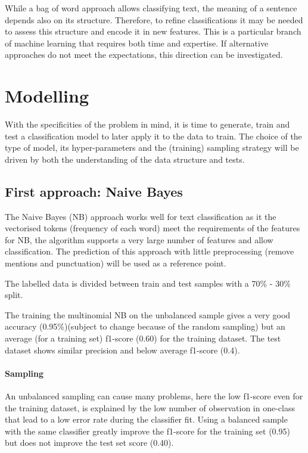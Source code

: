 \documentclass[a4paper]{tufte-handout}
\begin{document}
\begin{fullwidth}
While a bag of word approach allows classifying text, the meaning of a sentence depends also on its structure. Therefore, to refine classifications it may be needed to assess this structure and encode it in new features. This is a particular branch of machine learning that requires both time and expertise. If alternative approaches do not meet the expectations, this direction can be investigated.

\section{Modelling}

With the specificities of the problem in mind, it is time to generate, train and test a classification model to later apply it to the data to train. The choice of the type of model, its hyper-parameters and the (training) sampling strategy will be driven by both the understanding of the data structure and tests.

\subsection{First approach: Naive Bayes}

The Naive Bayes (NB) approach works well for text classification as it the vectorised tokens (frequency of each word) meet the requirements of the features for NB, the algorithm supports a very large number of features and allow classification. The prediction of this approach with little preprocessing (remove mentions and punctuation) will be used as a reference point.

The labelled data is divided between train and test samples with a 70\% - 30\% split.

The training the multinomial NB on the unbalanced sample gives a very good accuracy (0.95\%)(subject to change because of the random sampling) but an average (for a training set) f1-score (0.60) for the training dataset. The test dataset shows similar precision and below average f1-score (0.4).

\paragraph{Sampling}

An unbalanced sampling can cause many problems, here the low f1-score even for the training dataset, is explained by the low number of observation in one-class that lead to a low error rate during the classifier fit. Using a balanced sample with the same classifier greatly improve the f1-score for the training set (0.95) but does not improve the test set score (0.40). 


\end{fullwidth}
\end{document}
